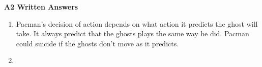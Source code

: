 \documentclass[10pt]{article}
\begin{document}
\textbf{A2 Written Answers}
\begin{enumerate}
\item Pacman's decision of action depends on what action it predicts the ghost will take. It always predict that the ghosts plays the same way he did. Pacman could suicide if the ghosts don't move as it predicts.
\item 
\end{enumerate}
\end{document}
